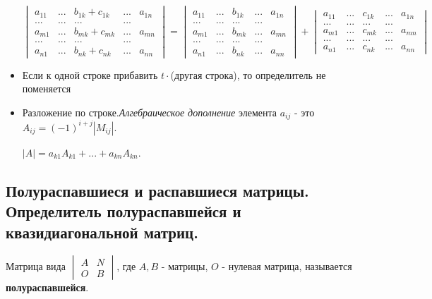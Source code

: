 \documentclass[a4paper]{article}
\begin{document}
\begin{htheorem}
\begin{itemize}
$\begin{vmatrix}
a_{11} & ... & b_{1k}+c_{1k} & ... & a_{1n} \\ ... & ... & ... & ... \\
a_{m1} & ... & b_{mk}+c_{mk} & ... & a_{mn} \\  ... & ... & ... & ... \\
a_{n1} & ... & b_{nk}+c_{nk} & ... & a_{nn}
\end{vmatrix} = \begin{vmatrix}
a_{11} & ... & b_{1k} & ... & a_{1n} \\ ... & ... & ... & ... \\
a_{m1} & ... & b_{mk} & ... & a_{mn} \\  ... & ... & ... & ... \\
a_{n1} & ... & b_{nk}& ... & a_{nn}
\end{vmatrix} + \begin{vmatrix}
a_{11} & ... & c_{1k} & ... & a_{1n} \\ ... & ... & ... & ... \\
a_{m1} & ... & c_{mk} & ... & a_{mn} \\  ... & ... & ... & ... \\
a_{n1} & ... & c_{nk} & ... & a_{nn}
\end{vmatrix} $



\item Если к одной строке прибавить $t \cdot$(другая строка), то определитель не поменяется
\item Разложение по строке.\textit{Алгебраическое дополнение} элемента $a_{ij}$ - это $A_{ij} = (-1)^{i+j} |M_{ij}|$.

$|A| = a_{k1}A_{k1} + ... + a_{kn}A_{kn}$.

\end{itemize}
\end{htheorem}

\subsection*{Полураспавшиеся и распавшиеся матрицы. Определитель полураспавшейся и квазидиагональной матриц.}

Матрица вида $\begin{vmatrix}
A & N \\ O & B
\end{vmatrix}$, где $A, B$ - матрицы, $O$ - нулевая матрица, называется \textbf{полураспавшейся}.
\end{document}
